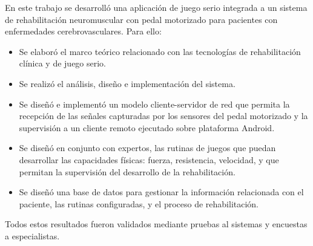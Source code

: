 \begin{conclusions}
En este trabajo se desarrolló una aplicación de juego serio integrada a un sistema de rehabilitación neuromuscular con pedal motorizado para pacientes con enfermedades cerebrovasculares. Para ello:
\begin{itemize}
    \item Se elaboró el marco teórico relacionado con las tecnologías de rehabilitación clínica y de juego serio.
    \item Se realizó el análisis, diseño e implementación del sistema.
    \item Se diseñó e implementó  un modelo cliente-servidor de red que permita la
    recepción de las señales capturadas por los sensores del pedal motorizado
    y la supervisión a un cliente remoto ejecutado sobre plataforma Android.
    \item Se diseñó en conjunto con expertos, las rutinas de juegos que
    puedan desarrollar las capacidades físicas: fuerza, resistencia, velocidad, y que
    permitan la supervisión del desarrollo de la rehabilitación.
    \item Se diseñó una base de datos para gestionar la información relacionada con
    el paciente, las rutinas configuradas, y el proceso de rehabilitación.
\end{itemize}
Todos estos resultados fueron validados mediante pruebas al sistemas y encuestas a especialistas.
\end{conclusions}